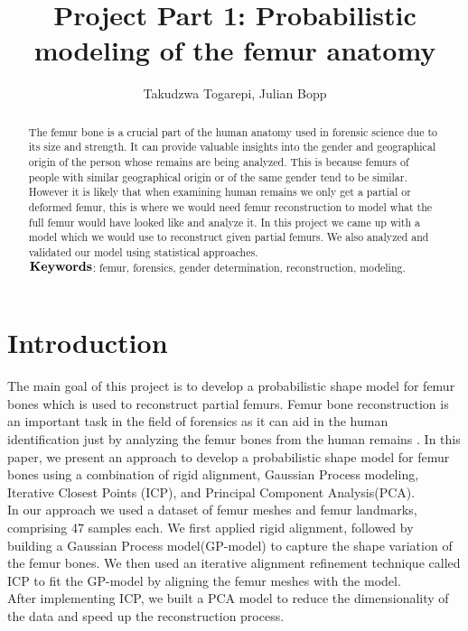 \documentclass[10pt]{article}
\author{Takudzwa Togarepi, Julian Bopp }
\title{Project Part 1: Probabilistic modeling of the femur anatomy}
\begin{document}
\maketitle
\begin{abstract}
\noindent
The femur bone is a crucial part of the human anatomy used in forensic science due to its size and strength. It can provide valuable insights into the gender and geographical origin of the person whose remains are being analyzed. This is because femurs of people with similar geographical origin or of the same gender tend to be similar. However it is likely that when examining human remains we only get a partial or deformed femur, this is where we would need femur reconstruction to model what the full femur would have looked like and analyze it. In this project we came up with a model which we would use to reconstruct given partial femurs. We also analyzed and validated our model using statistical approaches.\\

\noindent
$\bold{Keywords}$: femur, forensics, gender determination, reconstruction, modeling.
\end{abstract}

\section{Introduction}
The main goal of this project is to develop a probabilistic shape model for femur bones which is used to reconstruct partial femurs.
Femur bone reconstruction is an important task in the field of forensics as it can aid in the human identification just by analyzing the femur bones from the human remains . In this paper, we present an approach to develop a probabilistic shape model for femur bones using a combination of rigid alignment, Gaussian Process modeling, Iterative Closest Points (ICP), and Principal Component Analysis(PCA).\\

\noindent
In our approach we used a dataset of femur meshes and femur landmarks, comprising 47 samples each. We first applied rigid alignment, followed by building a Gaussian Process model(GP-model) to capture the shape variation of the femur bones. We then used an iterative alignment refinement technique called ICP to fit the GP-model by aligning the femur meshes with the model.\\

\noindent
After implementing ICP, we built a PCA model to reduce the dimensionality of the data and speed up the reconstruction process. 
\end{document}
